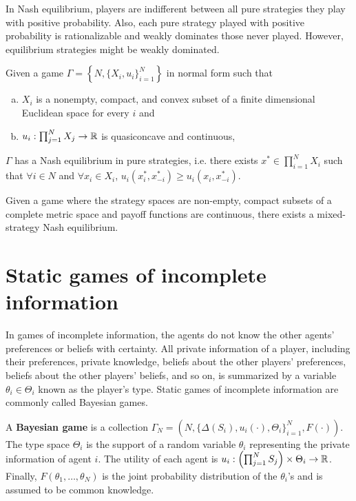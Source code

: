 \documentclass[10pt]{article}
\begin{document}
\begin{spacing}{1.0}
\begin{lemma}
  In Nash equilibrium, players are indifferent between all pure strategies
  they play with positive probability. Also, each pure strategy played with
  positive probability is rationalizable and weakly dominates those never
  played. However, equilibrium strategies might be weakly dominated.
\end{lemma}

\begin{theorem}
  Given a game $\Gamma = \left\{N, \{X_i, u_i\}_{i=1}^N\right\}$ in normal
  form such that
  \begin{enumerate}[a)]\leftskip = 1em
  \item $X_i$ is a nonempty, compact, and convex subset of a finite
    dimensional Euclidean space for every $i$ and
  \item $u_i : \prod_{j=1}^N X_j \to \mathbb{R}$ is quasiconcave and continuous,
  \end{enumerate}
  $\Gamma$ has a Nash equilibrium in pure strategies, i.e. there exists
  $x^* \in \prod_{i=1}^N X_i$ such that $\forall i \in N$ and $\forall
  x_i\in X_i$, $ u_i(x_i^*, x_{-i}^*) \geq u_i(x_i, x_{-i}^*)$.
\end{theorem}

\begin{theorem}
  Given a game where the strategy spaces are
  non-empty, compact subsets of a complete metric space and payoff
  functions are continuous, there exists a mixed-strategy Nash equilibrium.
\end{theorem}

\section{Static games of incomplete information}

In games of incomplete information, the agents do not know the other
agents' preferences or beliefs with certainty. All private information of a
player, including their preferences, private knowledge, beliefs about the
other players' preferences, beliefs about the other players' beliefs, and
so on, is summarized by a variable $\theta_i \in \Theta_i$ known as the
player's type. Static games of incomplete information are commonly called
Bayesian games.

\begin{definition}
  A \textbf{Bayesian game} is a collection $\Gamma_N = \left(N, \{\Delta(S_i),
    u_i(\cdot), \Theta_i\}_{i=1}^N, F(\cdot)\right)$. The type space $\Theta_i$
  is the support of a random variable $\theta_i$ representing the private
  information of agent $i$.  The utility of each agent is $u_i: \left(
    \prod_{j=1}^N S_j\right) \times \Theta_i  \to \mathbb{R}$. Finally, $F(\theta_1, \ldots, \theta_N)$ is the
  joint probability distribution of the $\theta_i$'s and is assumed to be
  common knowledge.
\end{definition}


\end{spacing}
\end{document}
